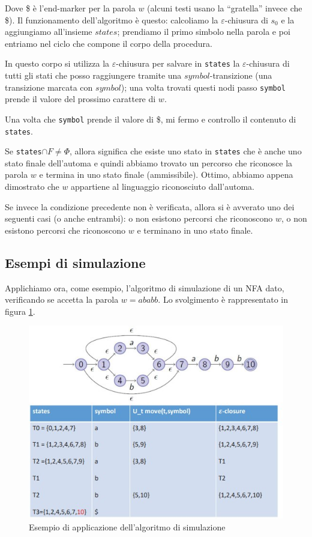 \documentclass[class=book, crop=false, oneside, 12pt]{standalone}
\begin{document}
Dove \$ è l’end-marker per la parola \(w\) (alcuni testi usano la “gratella” invece che \$).
Il funzionamento dell'algoritmo è questo: calcoliamo la \(\varepsilon\)-chiusura di \(s_0\) e la aggiungiamo all'insieme \(states\); prendiamo il primo simbolo nella parola e poi entriamo nel ciclo che compone il corpo della procedura.

In questo corpo si utilizza la \(\varepsilon\)-chiusura per salvare in \texttt{states} la \(\varepsilon\)-chiusura di tutti gli stati che posso raggiungere tramite una \(symbol\)-transizione (una transizione marcata con \(symbol\)); una volta trovati questi nodi passo \texttt{symbol} prende il valore del prossimo carattere di \(w\).

Una volta che \texttt{symbol} prende il valore di \$, mi fermo e controllo il contenuto di \texttt{states}.

Se \texttt{states}\(\cap F \neq \Phi\), allora significa che esiste uno stato in \texttt{states} che è anche uno stato finale dell'automa e quindi abbiamo trovato un percorso che riconosce la parola \(w\) e termina in uno stato finale (ammissibile). Ottimo, abbiamo appena dimostrato che \(w\) appartiene al linguaggio riconosciuto dall'automa.

Se invece la condizione precedente non è verificata, allora si è avverato uno dei seguenti casi (o anche entrambi): o non esistono percorsi che riconoscono \(w\), o non esistono percorsi che riconoscono \(w\) e terminano in uno stato finale.

\subsection{Esempi di simulazione}
Applichiamo ora, come esempio, l'algoritmo di simulazione di un NFA dato, verificando se accetta la parola \(w  = ababb\). Lo svolgimento è rappresentato in figura \ref{simulazione_es_1}.

\begin{figure}
    \centering
    \includegraphics[width=.6\textwidth,keepaspectratio]{simulazione_es_1}
    \caption{Esempio di applicazione dell'algoritmo di simulazione}
    \label{simulazione_es_1}
\end{figure}
\end{document}
